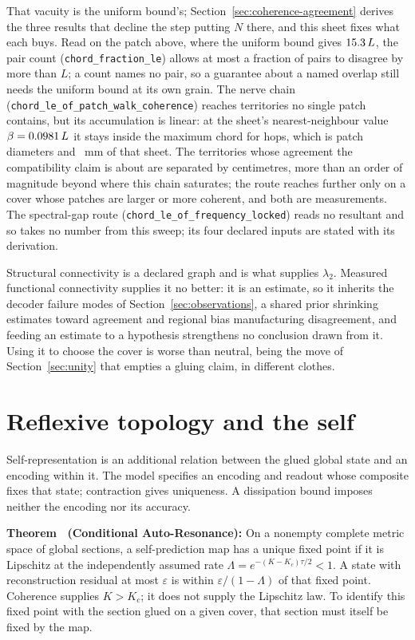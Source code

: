 \documentclass{article}
\begin{document}
That vacuity is the uniform bound's; Section~\ref{sec:coherence-agreement} derives the three results that decline the step putting $N$ there, and this sheet fixes what each buys. Read on the patch above, where the uniform bound gives $15.3\,L$, the pair count (\nolinkurl{chord_fraction_le}) allows at most a fraction \wavePatchPairFraction{} of pairs to disagree by more than $L$; a count names no pair, so a guarantee about a named overlap still needs the uniform bound at its own grain. The nerve chain (\nolinkurl{chord_le_of_patch_walk_coherence}) reaches territories no single patch contains, but its accumulation is linear: at the sheet's nearest-neighbour value $\beta=0.0981\,L$ it stays inside the maximum chord for \waveNerveHops{} hops, which is \waveNerveDiameters{} patch diameters and \waveNerveReachMm~mm of that sheet. The territories whose agreement the compatibility claim is about are separated by centimetres, more than an order of magnitude beyond where this chain saturates; the route reaches further only on a cover whose patches are larger or more coherent, and both are measurements. The spectral-gap route (\nolinkurl{chord_le_of_frequency_locked}) reads no resultant and so takes no number from this sweep; its four declared inputs are stated with its derivation.

Structural connectivity is a declared graph and is what supplies $\lambda_2$. Measured functional connectivity supplies it no better: it is an estimate, so it inherits the decoder failure modes of Section~\ref{sec:observations}, a shared prior shrinking estimates toward agreement and regional bias manufacturing disagreement, and feeding an estimate to a hypothesis strengthens no conclusion drawn from it. Using it to choose the cover is worse than neutral, being the move of Section~\ref{sec:unity} that empties a gluing claim, in different clothes.
\section{Reflexive topology and the self}
\label{sec:supp-self}
Self-representation is an additional relation between the glued global state and an encoding within it. The model specifies an encoding and readout whose composite fixes that state; contraction gives uniqueness. A dissipation bound imposes neither the encoding nor its accuracy.

\label{thm:supp-self}
\textbf{Theorem \thesuppresult\ (Conditional Auto-Resonance):} On a nonempty complete metric space of global sections, a self-prediction map has a unique fixed point if it is Lipschitz at the independently assumed rate $\Lambda=e^{-(K-K_c)\tau/2}<1$. A state with reconstruction residual at most $\varepsilon$ is within $\varepsilon/(1-\Lambda)$ of that fixed point. Coherence supplies $K>K_c$; it does not supply the Lipschitz law. To identify this fixed point with the section glued on a given cover, that section must itself be fixed by the map.
\end{document}

